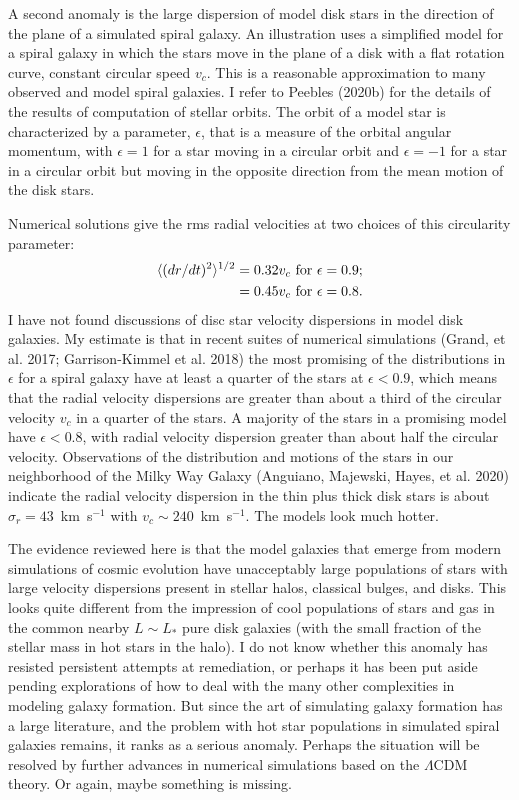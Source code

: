 \documentclass[fleqn,12pt]{article}
\begin{document}
A second anomaly is the large dispersion of model disk stars in the direction of the plane of a simulated spiral galaxy. An illustration uses a simplified model for a spiral galaxy in which the stars move in the plane of a disk with a flat rotation curve, constant circular speed $v_c$. This is a reasonable approximation to many observed and model spiral galaxies. I refer to Peebles (2020b) for the details of the results of computation of stellar orbits. The orbit of a model star is characterized by a parameter, $\epsilon$, that is a measure of the orbital angular momentum, with $\epsilon = 1$ for a star moving in a circular orbit and $\epsilon = -1$ for a star in a circular orbit but moving in the opposite direction from the mean motion of the disk stars.  

Numerical solutions give the rms radial velocities at two choices of this circularity parameter: 
\begin{align}
\langle (dr/dt)^2\rangle^{1/2} &= 0.32 v_c\hbox{ for } \epsilon = 0.9; \nonumber\\
	&= 0.45 v_c \hbox{ for } \epsilon = 0.8. \label{eq:radialveldispn}
\end{align}
I have not found discussions of disc star velocity dispersions in model disk galaxies. My estimate is that in recent suites of numerical simulations (Grand, et al. 2017; Garrison-Kimmel et al. 2018) the most promising of the distributions in $\epsilon$ for a spiral galaxy have at least a quarter of the stars at $\epsilon<0.9$, which means that the radial velocity dispersions are greater than about a third of the circular velocity $v_c$ in a quarter of the stars. A majority of the stars in a promising model have $\epsilon<0.8$, with radial velocity dispersion greater than about half the circular velocity. Observations of the distribution and motions of the stars in our neighborhood of the Milky Way Galaxy (Anguiano, Majewski, Hayes, et al. 2020) indicate the radial velocity dispersion in the thin plus thick disk stars is about $\sigma_r=43$~km~s$^{-1}$ with $v_c\sim 240$~km~s$^{-1}$. The models look much hotter. 

The evidence reviewed here is that the model galaxies that emerge from modern simulations of cosmic evolution have unacceptably large populations of stars with large velocity dispersions present in stellar halos, classical bulges, and disks. This looks quite different from the impression of cool populations of stars and gas in the common  nearby $L\sim L_\ast$ pure disk galaxies (with the small fraction of the stellar mass in hot stars in the halo). I do not know whether this anomaly has resisted persistent attempts at remediation, or perhaps it has been put aside pending explorations of how to deal with the many other complexities in modeling galaxy formation. But since the art of simulating galaxy formation has a large literature, and the problem with hot star populations in simulated spiral galaxies remains, it ranks as a serious anomaly. Perhaps the situation will  be resolved by further advances in numerical simulations based on the $\Lambda$CDM theory. Or again, maybe something is missing.
\end{document}
